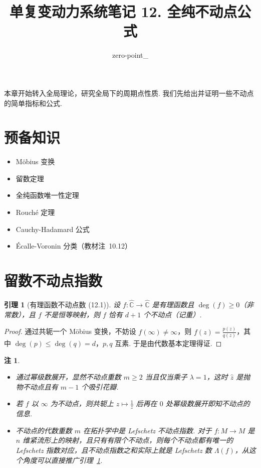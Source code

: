 \documentclass[11pt, a4paper, oneside]{ctexart}
\title{单复变动力系统笔记 12. 全纯不动点公式}
\author{zero-point\_}
\newtheorem{lemma}[theorem]{引理}
\newtheorem{remark}[theorem]{注}
\newcommand{\C}{\mathbb{C}}
\begin{document}
	\maketitle

    本章开始转入全局理论，研究全局下的周期点性质. 我们先给出并证明一些不动点的简单指标和公式.

    \section{预备知识}
    \begin{itemize}
        \item Möbius 变换
        \item 留数定理
        \item 全纯函数唯一性定理
        \item Rouché 定理
        \item Cauchy-Hadamard 公式
        \item Écalle-Voronin 分类（教材注~10.12）
    \end{itemize}

    \section{留数不动点指数}
    \begin{lemma}[有理函数不动点数 (12.1)]\label{引理12.1}
        设 $f:\hat{\C}\to\hat{\C}$ 是有理函数且 $\deg(f)\geq 0$（非常数），且 $f$ 不是恒等映射，则 $f$ 恰有 $d+1$ 个不动点（记重）.
    \end{lemma}
    \begin{proof}
        通过共轭一个 Möbius 变换，不妨设 $f(\infty)\neq \infty$，则 $f(z)=\frac{p(z)}{q(z)}$，其中 $\deg(p)\leq\deg(q)=d$，$p,q$ 互素. 于是由代数基本定理得证.
    \end{proof}
    \begin{remark}
        \begin{itemize}
            \item 通过幂级数展开，显然不动点重数 $m\geq 2$ 当且仅当乘子 $\lambda=1$，这时 $\hat{z}$ 是抛物不动点且有 $m-1$ 个吸引花瓣.
            \item 若 $f$ 以 $\infty$ 为不动点，则共轭上 $z\mapsto \frac{1}{z}$ 后再在 $0$ 处幂级数展开即知不动点的信息.
            \item 不动点的代数重数 $m$ 在拓扑学中是 Lefschetz 不动点指数. 对于 $f:M\to M$ 是 $n$ 维紧流形上的映射，且只有有限个不动点，则每个不动点都有唯一的 Lefschetz 指数对应，且不动点指数之和实际上就是 Lefschetz 数 $\Lambda(f)$，从这个角度可以直接推广引理~\ref{引理12.1}.
        \end{itemize}
    \end{remark}
\end{document}
